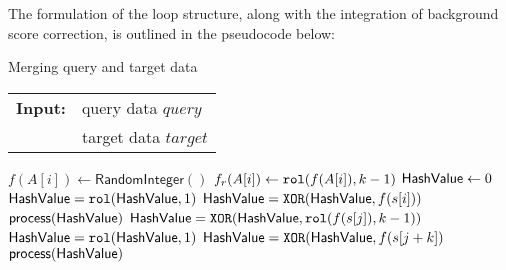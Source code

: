 The formulation of the loop structure, along with the integration of background score correction, is outlined in the pseudocode below:
\begin{algorithm}[t]
\caption{Merging query and target data}
\label{code:merging_data}
\begin{tabular}{@{}l@{~}l}
\textbf{Input:}&query data \(query\)\\
               &target data \(target\)
\end{tabular}
\begin{algorithmic}
 
\State \(f(A[i]) \gets \mathsf{RandomInteger}()\)
\EndFor
{} 
\State \(f_r(A[i]) \gets \mathtt{rol}(f(A[i]),k-1)\)
\EndFor
\State \(\mathsf{HashValue} \gets 0\)
 
\State \(\mathsf{HashValue} = \mathtt{rol}(\mathsf{HashValue},1)\)
\State \(\mathsf{HashValue} = \mathtt{XOR}(\mathsf{HashValue},f(s[i]))\)
\EndFor
\State \(\mathsf{process}(\mathsf{HashValue})\)
 
\State \(\mathsf{HashValue} = \mathtt{XOR}(\mathsf{HashValue},\mathtt{rol}(f(s[j]),k-1))\)
\State \(\mathsf{HashValue} = \mathtt{rol}(\mathsf{HashValue},1)\)
\State \(\mathsf{HashValue} = \mathtt{XOR}(\mathsf{HashValue},f(s[j+k])\)
\State \(\mathsf{process}(\mathsf{HashValue})\)
\EndFor
\end{algorithmic}
\end{algorithm}